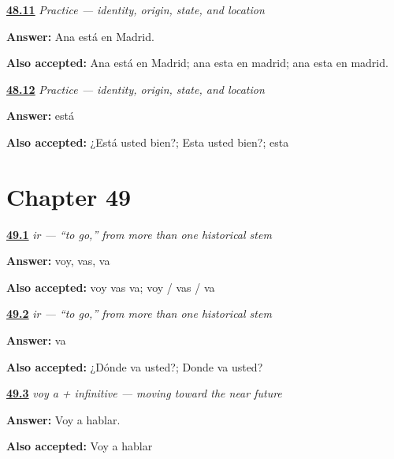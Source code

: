 \noindent\begin{minipage}[t]{\linewidth}
\raggedright
\hyperlink{review-ES-C09-practice-location}{\textbf{48.11}} \emph{Practice — identity, origin, state, and location}\par
\small \textbf{Answer:} Ana está en Madrid.\par
\footnotesize \textbf{Also accepted:} Ana está en Madrid; ana esta en madrid; ana esta en madrid.
\end{minipage}\par\medskip

\noindent\begin{minipage}[t]{\linewidth}
\raggedright
\hyperlink{review-ES-C09-practice-state}{\textbf{48.12}} \emph{Practice — identity, origin, state, and location}\par
\small \textbf{Answer:} está\par
\footnotesize \textbf{Also accepted:} ¿Está usted bien?; Esta usted bien?; esta
\end{minipage}\par\medskip

\section*{Chapter 49}

\noindent\begin{minipage}[t]{\linewidth}
\raggedright
\hyperlink{review-ES-C10-ir-singular-forms}{\textbf{49.1}} \emph{ir — “to go,” from more than one historical stem}\par
\small \textbf{Answer:} voy, vas, va\par
\footnotesize \textbf{Also accepted:} voy vas va; voy / vas / va
\end{minipage}\par\medskip

\noindent\begin{minipage}[t]{\linewidth}
\raggedright
\hyperlink{review-ES-C10-ir-formal-question}{\textbf{49.2}} \emph{ir — “to go,” from more than one historical stem}\par
\small \textbf{Answer:} va\par
\footnotesize \textbf{Also accepted:} ¿Dónde va usted?; Donde va usted?
\end{minipage}\par\medskip

\noindent\begin{minipage}[t]{\linewidth}
\raggedright
\hyperlink{review-ES-C10-ir-a-futuro-voy-hablar}{\textbf{49.3}} \emph{voy a + infinitive — moving toward the near future}\par
\small \textbf{Answer:} Voy a hablar.\par
\footnotesize \textbf{Also accepted:} Voy a hablar
\end{minipage}\par\medskip

